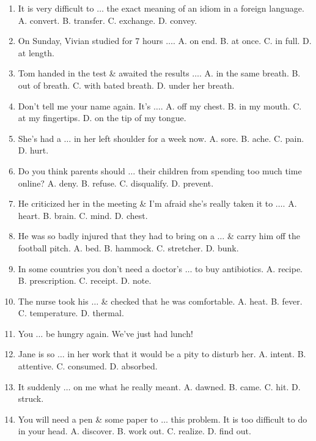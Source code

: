 \documentclass{article}
\numberwithin{equation}{section}
\begin{document}
\begin{enumerate}[leftmargin=8mm]
	\item It is very difficult to $\ldots$ the exact meaning of an idiom in a foreign language. {\sf A.} convert. {\sf B.} transfer. {\sf C.} exchange. {\sf D.} convey.
	\item On Sunday, Vivian studied for 7 hours $\ldots$. {\sf A.} on end. {\sf B.} at once. {\sf C.} in full. {\sf D.} at length.
	\item Tom handed in the test \& awaited the results $\ldots$. {\sf A.} in the same breath. {\sf B.} out of breath. {\sf C.} with bated breath. {\sf D.} under her breath.
	\item Don't tell me your name again. It's $\ldots$. {\sf A.} off my chest. {\sf B.} in my mouth. {\sf C.} at my fingertips. {\sf D.} on the tip of my tongue.
	\item She's had a $\ldots$ in her left shoulder for a week now. {\sf A.} sore. {\sf B.} ache. {\sf C.} pain. {\sf D.} hurt.
	\item Do you think parents should $\ldots$ their children from spending too much time online? {\sf A.} deny. {\sf B.} refuse. {\sf C.} disqualify. {\sf D.} prevent.
	\item He criticized her in the meeting \& I'm afraid she's really taken it to $\ldots$. {\sf A.} heart. {\sf B.} brain. {\sf C.} mind. {\sf D.} chest.
	\item He was so badly injured that they had to bring on a $\ldots$ \& carry him off the football pitch. {\sf A.} bed. {\sf B.} hammock. {\sf C.} stretcher. {\sf D.} bunk.
	\item In some countries you don't need a doctor's $\ldots$ to buy antibiotics. {\sf A.} recipe. {\sf B.} prescription. {\sf C.} receipt. {\sf D.} note.
	\item The nurse took his $\ldots$ \& checked that he was comfortable. {\sf A.} heat. {\sf B.} fever. {\sf C.} temperature. {\sf D.} thermal.
	\item You $\ldots$ be hungry again. We've just had lunch!
	\item Jane is so $\ldots$ in her work that it would be a pity to disturb her. {\sf A.} intent. {\sf B.} attentive. {\sf C.} consumed. {\sf D.} absorbed.
	\item It suddenly $\ldots$ on me what he really meant. {\sf A.} dawned. {\sf B.} came. {\sf C.} hit. {\sf D.} struck.
	\item You will need a pen \& some paper to $\ldots$ this problem. It is too difficult to do in your head. {\sf A.} discover. {\sf B.} work out. {\sf C.} realize. {\sf D.} find out.

\end{enumerate}
\end{document}
